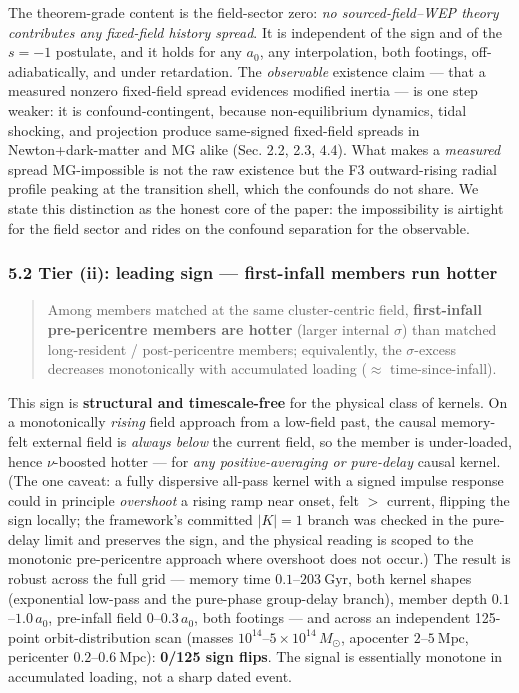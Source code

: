 \documentclass[
]{article}
\begin{document}
The theorem-grade content is the field-sector zero: \emph{no
sourced-field--WEP theory contributes any fixed-field history spread}.
It is independent of the sign and of the \(s=-1\) postulate, and it
holds for any \(a_0\), any interpolation, both footings,
off-adiabatically, and under retardation. The \emph{observable}
existence claim --- that a measured nonzero fixed-field spread evidences
modified inertia --- is one step weaker: it is confound-contingent,
because non-equilibrium dynamics, tidal shocking, and projection produce
same-signed fixed-field spreads in Newton+dark-matter and MG alike (Sec.
2.2, 2.3, 4.4). What makes a \emph{measured} spread MG-impossible is not
the raw existence but the F3 outward-rising radial profile peaking at
the transition shell, which the confounds do not share. We state this
distinction as the honest core of the paper: the impossibility is
airtight for the field sector and rides on the confound separation for
the observable.

\subsubsection{5.2 Tier (ii): leading sign --- first-infall members run
hotter}\label{tier-ii-leading-sign-first-infall-members-run-hotter}

\begin{quote}
Among members matched at the same cluster-centric field,
\textbf{first-infall pre-pericentre members are hotter} (larger internal
\(\sigma\)) than matched long-resident / post-pericentre members;
equivalently, the \(\sigma\)-excess decreases monotonically with
accumulated loading (\(\approx\) time-since-infall).
\end{quote}

This sign is \textbf{structural and timescale-free} for the physical
class of kernels. On a monotonically \emph{rising} field approach from a
low-field past, the causal memory-felt external field is \emph{always
below} the current field, so the member is under-loaded, hence
\(\nu\)-boosted hotter --- for \emph{any positive-averaging or
pure-delay} causal kernel. (The one caveat: a fully dispersive all-pass
kernel with a signed impulse response could in principle
\emph{overshoot} a rising ramp near onset, felt \(>\) current, flipping
the sign locally; the framework's committed \(|K|=1\) branch was checked
in the pure-delay limit and preserves the sign, and the physical reading
is scoped to the monotonic pre-pericentre approach where overshoot does
not occur.) The result is robust across the full grid --- memory time
\(0.1\)--\(203\ \mathrm{Gyr}\), both kernel shapes (exponential low-pass
and the pure-phase group-delay branch), member depth
\(0.1\)--\(1.0\,a_0\), pre-infall field \(0\)--\(0.3\,a_0\), both
footings --- and across an independent 125-point orbit-distribution scan
(masses \(10^{14}\)--\(5\times10^{14}\,M_\odot\), apocenter
\(2\)--\(5\ \mathrm{Mpc}\), pericenter \(0.2\)--\(0.6\ \mathrm{Mpc}\)):
\textbf{0/125 sign flips}. The signal is essentially monotone in
accumulated loading, not a sharp dated event.
\end{document}
